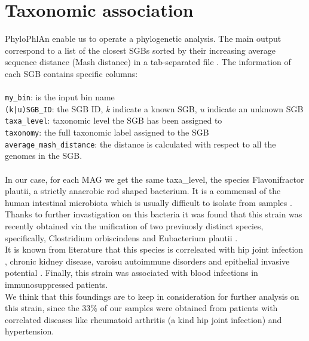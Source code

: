 \documentclass[a4paper,titlepage, oneside]{book}
\newcommand{\code}[1]{\colorbox{light-gray}{\texttt{#1}}}
\begin{document}
\section{Taxonomic association}
PhyloPhlAn enable us to operate a phylogenetic analysis. The main output correspond to a list of the closest SGBs sorted by their increasing average sequence distance (Mash distance) in a tab-separated file \cite{PhyloGuide}. The information of each SGB contains specific columns:
\\
\\ \code{my\_bin}: is the input bin name
\\ \code{(k|u)SGB\_ID}: the SGB ID, \textit{k} indicate a known SGB, \textit{u} indicate an unknown SGB
\\ \code{taxa\_level}: taxonomic level the SGB has been assigned to
\\ \code{taxonomy}: the full taxonomic label assigned to the SGB
\\ \code{average\_mash\_distance}: the distance is calculated with respect to all the genomes in the SGB.
\\
\newline
\\In our case, for each MAG we get the same taxa\_level, the species Flavonifractor plautii, a strictly anaerobic rod shaped bacterium. It is a commensal of the human intestinal microbiota which is  usually difficult to isolate from samples \cite{Plauti}.
\\Thanks to further invastigation on this bacteria it was found that this strain was recently obtained via the unification of two previuosly distinct species, specifically, Clostridium orbiscindens and Eubacterium plautii \cite{Unification}.
\\It is known from literature that this species is correleated with hip joint infection \cite{HipJoint}, chronic kidney disease, varoisu autoimmune disorders and epithelial invasive potential \cite{PlautiiDiseases}. Finally, this strain was associated with blood infections in immunosuppressed patients\cite{PlautiiBlood}.
\\We think that this foundings are to keep in consideration for further analysis on this strain, since the 33\% of our samples were obtained from patients with correlated diseases like rheumatoid arthritis (a kind hip joint infection) and hypertension.
\end{document}
